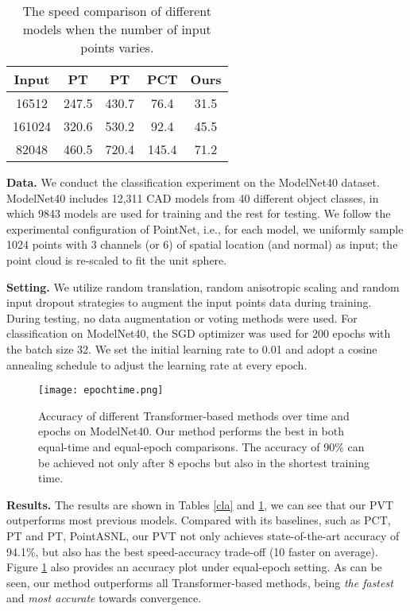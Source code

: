 \documentclass[10pt,twocolumn,letterpaper]{article}
\begin{document}
\begin{table}  
\centering
\begin{center} 
\begin{tabular}{|c|cccc|}   
\hline
Input & PT & PT & PCT & Ours\\
\hline
16512 & 247.5 & 430.7 & 76.4 & 31.5  \\
161024 & 320.6 & 530.2 &92.4& 45.5\\
82048 & 460.5 & 720.4 &145.4& 71.2  \\
\hline
\end{tabular}  
\end{center}  
\caption{The speed comparison of different models when the number of input points varies.} 
\label{speedcompa}
\end{table} 

\textbf{Data. }We conduct the classification experiment on the ModelNet40 \cite{modelnet40} dataset. ModelNet40 includes 12,311 CAD models from 40 different object classes, in which 9843 models are used for training and the rest for testing. We follow the experimental configuration of PointNet, i.e., for each model, we uniformly sample 1024 points with 3 channels (or 6) of spatial location (and normal) as input; the point cloud is re-scaled to fit the unit sphere.

\textbf{Setting.} We utilize random translation, random anisotropic scaling and random input dropout strategies to augment the input points data during training. During testing, no data augmentation or voting methods were used. For classification on ModelNet40, the SGD optimizer was used for 200 epochs with the batch size 32. We set the initial learning rate to 0.01 and adopt a cosine annealing schedule to adjust the learning rate at every epoch.

\begin{figure}
    \centering
     \texttt{[image: epochtime.png]}
    \caption{Accuracy of different Transformer-based
methods over time and epochs on ModelNet40. Our method performs the best in both equal-time and equal-epoch comparisons. The accuracy of 90\% can be achieved not only after 8 epochs but also in the shortest training time.}
    \label{epochandtime}
\end{figure}
\textbf{Results.} The results are shown in Tables \ref{cla} and \ref{speedcompa}, we can see that our PVT outperforms most previous models. Compared with its baselines, such as PCT, PT and PT, PointASNL, our PVT not only achieves state-of-the-art accuracy of 94.1\%, but also has the best speed-accuracy trade-off (10 faster on average). Figure \ref{epochandtime} also provides an accuracy plot under equal-epoch setting. As can be seen, our method outperforms all Transformer-based methods, being \emph{the fastest} and \emph{most accurate} towards convergence.
\end{document}
